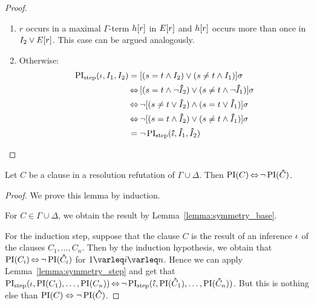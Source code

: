\begin{proof}
\begin{indproof}
\begin{enumerate}
						\item $r$ occurs in a maximal $\Gamma$-term $h[r]$ in $E[r]$ and $h[r]$ occurs more than once in $I_2 \lor E[r]$.
							This case can be argued analogously.
						\item Otherwise:
							\begin{align*}
								\operatorname{PI}_{\mathrm{step}}(\iota, I_1, I_2) &= [ ( s=t \land I_2 ) \lor (s\neq t \land I_1) ]\sigma \\
														&\operatorname{\Leftrightarrow}\, [ ( s=t \land \lnot \bm\hat{I}_2 ) \lor (s\neq t \land \lnot \bm\hat{I}_1) ]\sigma \\
														&\operatorname{\Leftrightarrow} \lnot [ ( s\neq t \lor \bm\hat{I}_2 ) \land (s=t \lor \bm\hat{I}_1) ]\sigma \\
														&\operatorname{\Leftrightarrow} \lnot [ ( s=t \land \bm\hat{I}_2 ) \lor (s\neq t \land \bm\hat{I}_1) ]\sigma \\
													 &= \lnot \operatorname{PI}_{\mathrm{step}}(\bm\hat{\iota}, \bm\hat{I}_1, \bm\hat{I}_2)
								\qedhere
							\end{align*}
					\end{enumerate}


	\end{indproof}

\end{proof}



\begin{lemma}
	\label{lemma:symmetry}
	Let $C$ be a clause in a resolution refutation of $\Gamma \cup \Delta$.
	Then
	$\operatorname{PI}(C) \operatorname{\Leftrightarrow} \lnot \operatorname{PI}(\bm\hat{C})$.
\end{lemma}
\begin{proof}
	We prove this lemma by induction.

	For $C \in \Gamma \cup \Delta$, we obtain the result by Lemma~\ref{lemma:symmetry_base}.

	For the induction step, suppose that the clause $C$ is the result of an inference $\iota$ of the clauses $C_1, \dots, C_n$.
	Then by the induction hypothesis, we obtain that  $\operatorname{PI}(C_i) \operatorname{\Leftrightarrow} \lnot \operatorname{PI}(\bm\hat{C}_i)$ for $1 \varleq i \varleq n$. 
	Hence we can apply Lemma~\ref{lemma:symmetry_step} and get that  $\operatorname{PI}_{\mathrm{step}}(\iota, \operatorname{PI}(C_1), \dots, \operatorname{PI}(C_n)) \operatorname{\Leftrightarrow} \lnot \operatorname{PI}_{\mathrm{step}}(\bm\hat{\iota}, \operatorname{PI}(\bm\hat{C}_1), \dots, \operatorname{PI}(\bm\hat{C}_n))$.
	But this is nothing else than $\operatorname{PI}(C) \;{\operatorname{\Leftrightarrow}}\; \lnot \operatorname{PI}(\bm\hat{C})$.
\end{proof}



